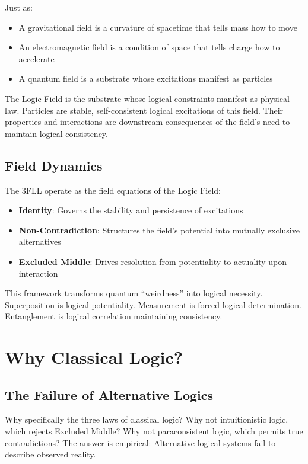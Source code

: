\documentclass[12pt,a4paper]{article}
\begin{document}
Just as:
\begin{itemize}
\item A gravitational field is a curvature of spacetime that tells mass how to move
\item An electromagnetic field is a condition of space that tells charge how to accelerate
\item A quantum field is a substrate whose excitations manifest as particles
\end{itemize}

The Logic Field is the substrate whose logical constraints manifest as physical law. Particles are stable, self-consistent logical excitations of this field. Their properties and interactions are downstream consequences of the field's need to maintain logical consistency.

\subsection{Field Dynamics}

The 3FLL operate as the field equations of the Logic Field:

\begin{itemize}
\item \textbf{Identity}: Governs the stability and persistence of excitations
\item \textbf{Non-Contradiction}: Structures the field's potential into mutually exclusive alternatives
\item \textbf{Excluded Middle}: Drives resolution from potentiality to actuality upon interaction
\end{itemize}

This framework transforms quantum ``weirdness'' into logical necessity. Superposition is logical potentiality. Measurement is forced logical determination. Entanglement is logical correlation maintaining consistency.

\section{Why Classical Logic?}

\subsection{The Failure of Alternative Logics}

Why specifically the three laws of classical logic? Why not intuitionistic logic, which rejects Excluded Middle? Why not paraconsistent logic, which permits true contradictions? The answer is empirical: Alternative logical systems fail to describe observed reality.
\end{document}
